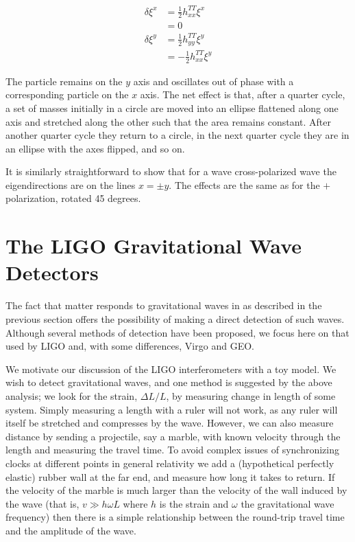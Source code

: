 \begin{align*}
\delta \xi^x &= \frac{1}{2} h^{TT}_{xx} \xi^x \\
&= 0 \\
\delta \xi^y &= \frac{1}{2} h^{TT}_{yy} \xi^y \\
&= - \frac{1}{2} h^{TT}_{xx} \xi^y
\end{align*}

The particle remains on the $y$ axis and oscillates out of phase with
a corresponding particle on the $x$ axis.  The net effect is that,
after a quarter cycle, a set of masses initially in a circle are moved
into an ellipse flattened along one axis and stretched along the other
such that the area remains constant.  After another quarter cycle they
return to a circle, in the next quarter cycle they are in an ellipse
with the axes flipped, and so on.

It is similarly straightforward to show that for a wave
cross-polarized wave the eigendirections are on the lines $x=\pm y$.
The effects are the same as for the $+$ polarization, rotated 45
degrees.


\section{The LIGO Gravitational Wave Detectors}
\label{sec:ligo_detectors}

The fact that matter responds to gravitational waves in as described
in the previous section offers the possibility of making a direct
detection of such waves.  Although several methods of detection have
been proposed, we focus here on that used by LIGO and, with some
differences, Virgo and GEO.

We motivate our discussion of the LIGO interferometers with a toy
model.  We wish to detect gravitational waves, and one method is
suggested by the above analysis; we look for the strain, $\Delta L/L$,
by measuring change in length of some system.  Simply measuring a
length with a ruler will not work, as any ruler will itself be
stretched and compresses by the wave.  However, we can also measure
distance by sending a projectile, say a marble, with known
velocity through the length and measuring the travel time.  To avoid
complex issues of synchronizing clocks at different points in general
relativity we add a (hypothetical perfectly elastic) rubber wall at
the far end, and measure how long it takes to return.  If the velocity
of the marble is much larger than the velocity of the wall induced by
the wave (that is, $v \gg h \omega L$ where $h$ is the strain and
$\omega$ the gravitational wave frequency) then there is a simple
relationship between the round-trip travel time and the amplitude of
the wave.

